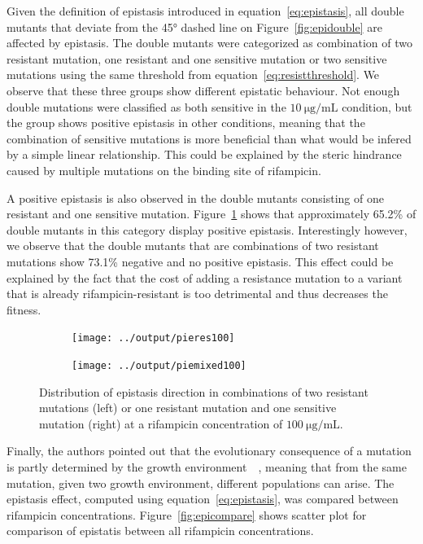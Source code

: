 \documentclass[12pt]{article}
\begin{document}
  Given the definition of epistasis introduced in
  equation~\eqref{eq:epistasis}, all double mutants that deviate from the
  45\si{\degree} dashed line on Figure~\ref{fig:epidouble} are affected by
  epistasis. The double mutants were categorized as combination of two
  resistant mutation, one resistant and one sensitive mutation or two sensitive
  mutations using the same threshold from equation~\eqref{eq:resistthreshold}.
  We observe that these three groups show different epistatic behaviour. Not
  enough double mutations were classified as both sensitive in the
  $\SI{10}{\micro\gram\per\milli\liter}$ condition, but the group shows
  positive epistasis in other conditions, meaning that the combination of
  sensitive mutations is more beneficial than what would be infered by a simple
  linear relationship. This could be explained by the steric hindrance caused
  by multiple mutations on the binding site of rifampicin.

  A positive epistasis is also observed in the double mutants consisting of one
  resistant and one sensitive mutation. Figure~\ref{fig:epidirection} shows
  that approximately 65.2\% of double mutants in this category display positive
  epistasis. Interestingly however, we observe that the double mutants that are
  combinations of two resistant mutations show 73.1\% negative and no positive
  epistasis. This effect could be explained by the fact that the cost of adding
  a resistance mutation to a variant that is already rifampicin-resistant is
  too detrimental and thus decreases the fitness.

  \begin{figure}[!ht]
    \begin{subfigure}{.5\textwidth}
      \centering
      \texttt{[image: ../output/pieres100]}
    \end{subfigure}
    \begin{subfigure}{.5\textwidth}
      \centering
      \texttt{[image: ../output/piemixed100]}
    \end{subfigure}
    \caption{Distribution of epistasis direction in combinations of two
    resistant mutations (left) or one resistant mutation and one sensitive
    mutation (right) at a rifampicin concentration of
    $\SI{100}{\micro\gram\per\milli\liter}$.}%
    \label{fig:epidirection}
  \end{figure}

  Finally, the authors pointed out that the evolutionary consequence of a
  mutation is partly determined by the growth
  environment~\cite{remold2004}~\cite{weinreich2005}, meaning that from the
  same mutation, given two growth environment, different populations can arise.
  The epistasis effect, computed using equation~\eqref{eq:epistasis}, was
  compared between rifampicin concentrations. Figure~\ref{fig:epicompare} shows
  scatter plot for comparison of epistatis between all rifampicin
  concentrations.
\end{document}
